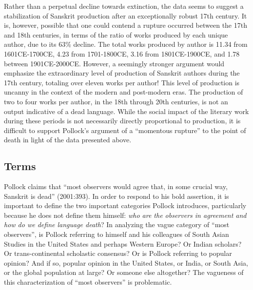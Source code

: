 Rather than a perpetual decline towards extinction, the data seems to suggest a stabilization of Sanskrit production after an exceptionally robust 17th century. It is, however, possible that one could contend a rupture occurred between the 17th and 18th centuries, in terms of the ratio of works produced by each unique author, due to its 63\% decline. The total works produced by author is 11.34 from 1601CE-1700CE, 4.23 from 1701-1800CE, 3.16 from 1801CE-1900CE, and 1.78 between 1901CE-2000CE. However, a seemingly stronger argument would emphasize the extraordinary level of production of Sanskrit authors during the 17th century, totaling over eleven works per author! This level of production is uncanny in the context of the modern and post-modern eras. The production of two to four works per author, in the 18th through 20th centuries, is not an output indicative of a dead language. While the social impact of the literary work during these periods is not necessarily directly proportional to production, it is difficult to support Pollock’s argument of a “momentous rupture” to the point of death in light of the data presented above. 
\vskip-10pt

\subsection*{Terms}
\vskip -3pt

Pollock claims that “most observers would agree that, in some crucial way, Sanskrit is dead” (2001:393). In order to respond to his bold assertion, it is important to define the two important categories Pollock introduces, particularly because he does not define them himself: {\sl who are the observers in agreement and how do we define language death}? In analyzing the vague category of “most observers”, is Pollock referring to himself and his colleagues of South Asian Studies in the United States and perhaps Western Europe? Or Indian scholars? Or trans-continental scholastic consensus? Or is Pollock referring to popular opinion? And if so, popular opinion in the United States, or India, or South Asia, or the global population at large? Or someone else altogether? The vagueness of this characterization of “most observers” is problematic. 

